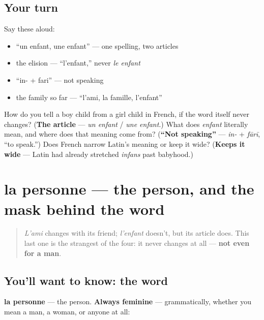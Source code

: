 \subsection*{Your turn}
Say these aloud:

\begin{itemize}
\raggedright
  \item \textquotedblleft{}un enfant, une enfant\textquotedblright{} — one spelling, two articles
  \item the elision — \textquotedblleft{}l'enfant,\textquotedblright{} never \emph{le enfant}
  \item \textquotedblleft{}in- + fari\textquotedblright{} — not speaking
  \item the family so far — \textquotedblleft{}l'ami, la famille, l'enfant\textquotedblright{}
\end{itemize}

\begin{tcolorbox}[breakable,colback=teal!4,colframe=teal!35!black,title={Before you move on}]
How do you tell a boy child from a girl child in French, if the word itself never changes? (\textbf{The article} — \emph{un enfant} / \emph{une enfant}.) What does \emph{enfant} literally mean, and where does that meaning come from? (\textbf{\textquotedblleft{}Not speaking\textquotedblright{}} — \emph{in-} + \emph{fārī}, \textquotedblleft{}to speak.\textquotedblright{}) Does French narrow Latin's meaning or keep it wide? (\textbf{Keeps it wide} — Latin had already stretched \emph{infans} past babyhood.)
\end{tcolorbox}
\section[la personne]{la personne — the person, and the mask behind the word}

\label{lesson:FR-C29-personne}



\begin{quote}
\emph{L'ami} changes with its friend; \emph{l'enfant} doesn't, but its article does. This last one is the strangest of the four: it never changes at all — \textbf{not even for a man}.
\end{quote}

\subsection*{You'll want to know: the word}
\textbf{la personne} — the person. \textbf{Always feminine} — grammatically, whether you mean a man, a woman, or anyone at all:

